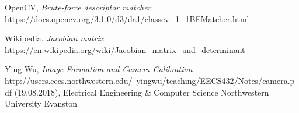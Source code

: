 \documentclass[11pt,a4paper,titlepage,oneside]{report}
\begin{document}
\begin{thebibliography}{1}
	OpenCV,
	\textit{Brute-force descriptor matcher}
	https://docs.opencv.org/3.1.0/d3/da1/classcv\_1\_1BFMatcher.html

	Wikipedia,
	\textit{Jacobian matrix}
	https://en.wikipedia.org/wiki/Jacobian\_matrix\_and\_determinant

	Ying Wu,
	\textit{Image Formation and Camera Calibration}
	http://users.eecs.northwestern.edu/~yingwu/teaching/EECS432/Notes/camera.pdf (19.08.2018), Electrical Engineering \& Computer Science Northwestern University Evanston

\end{thebibliography}
\end{document}
